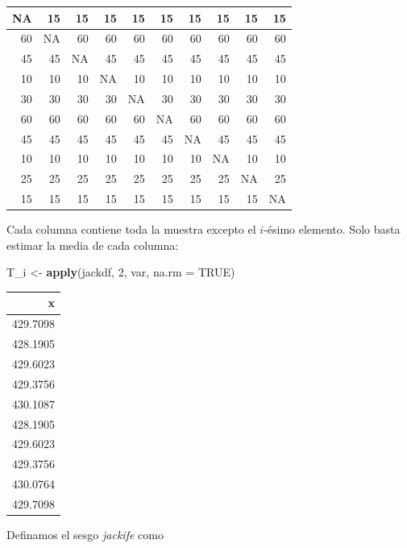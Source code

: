 \documentclass[
  12pt,
]{book}
\newenvironment{Shaded}{\begin{snugshade}}{\end{snugshade}}
\newcommand{\DataTypeTok}[1]{\textcolor[rgb]{0.13,0.29,0.53}{#1}}
\newcommand{\DecValTok}[1]{\textcolor[rgb]{0.00,0.00,0.81}{#1}}
\newcommand{\KeywordTok}[1]{\textcolor[rgb]{0.13,0.29,0.53}{\textbf{#1}}}
\newcommand{\NormalTok}[1]{#1}
\newcommand{\OtherTok}[1]{\textcolor[rgb]{0.56,0.35,0.01}{#1}}
\newcommand{\StringTok}[1]{\textcolor[rgb]{0.31,0.60,0.02}{#1}}
\theoremstyle{definition}
\theoremstyle{definition}
\theoremstyle{definition}
\theoremstyle{remark}
\begin{document}
\begin{tabular}{r|r|r|r|r|r|r|r|r|r}
\hline
NA & 15 & 15 & 15 & 15 & 15 & 15 & 15 & 15 & 15\\
\hline
60 & NA & 60 & 60 & 60 & 60 & 60 & 60 & 60 & 60\\
\hline
45 & 45 & NA & 45 & 45 & 45 & 45 & 45 & 45 & 45\\
\hline
10 & 10 & 10 & NA & 10 & 10 & 10 & 10 & 10 & 10\\
\hline
30 & 30 & 30 & 30 & NA & 30 & 30 & 30 & 30 & 30\\
\hline
60 & 60 & 60 & 60 & 60 & NA & 60 & 60 & 60 & 60\\
\hline
45 & 45 & 45 & 45 & 45 & 45 & NA & 45 & 45 & 45\\
\hline
10 & 10 & 10 & 10 & 10 & 10 & 10 & NA & 10 & 10\\
\hline
25 & 25 & 25 & 25 & 25 & 25 & 25 & 25 & NA & 25\\
\hline
15 & 15 & 15 & 15 & 15 & 15 & 15 & 15 & 15 & NA\\
\hline
\end{tabular}

Cada columna contiene toda la muestra excepto el \(i\)-ésimo
elemento. Solo basta estimar la media de cada columna:

\begin{Shaded}
\begin{Highlighting}[]
\NormalTok{T_i <-}\StringTok{ }\KeywordTok{apply}\NormalTok{(jackdf, }\DecValTok{2}\NormalTok{, var, }\DataTypeTok{na.rm =} \OtherTok{TRUE}\NormalTok{)}
\end{Highlighting}
\end{Shaded}

\begin{tabular}{r}
\hline
x\\
\hline
429.7098\\
\hline
428.1905\\
\hline
429.6023\\
\hline
429.3756\\
\hline
430.1087\\
\hline
428.1905\\
\hline
429.6023\\
\hline
429.3756\\
\hline
430.0764\\
\hline
429.7098\\
\hline
\end{tabular}

Definamos el sesgo \emph{jackife} como
\end{document}
